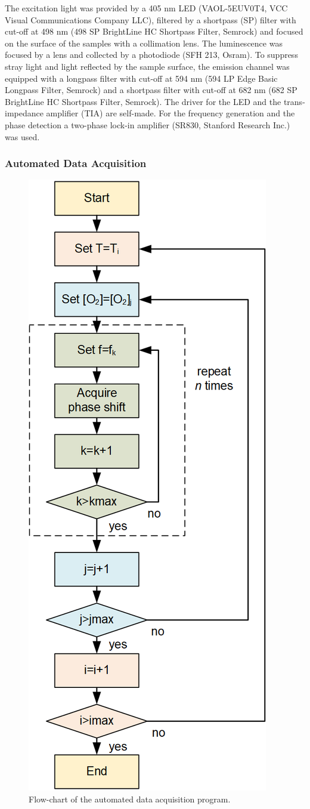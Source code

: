 \documentclass[sensors,article,submit,moreauthors,pdftex,10pt,a4paper]{Definitions/mdpi}
\begin{document}
The excitation light was provided by a 405 nm LED (VAOL-5EUV0T4, VCC Visual Communications Company LLC), filtered by a shortpass (SP) filter with cut-off at 498 nm (498 SP BrightLine HC Shortpass Filter, Semrock) and focused on the surface of the samples with a collimation lens. The luminescence was focused by a lens and collected by a photodiode (SFH 213, Osram).
To suppress stray light and light reflected by the sample surface, the emission channel was equipped with a longpass filter with cut-off at 594 nm (594 LP Edge Basic Longpass Filter, Semrock) and a shortpass filter with cut-off at 682 nm (682 SP BrightLine HC Shortpass Filter, Semrock). The driver for the LED and the trans-impedance amplifier (TIA) are self-made.
For the frequency generation and the phase detection a two-phase lock-in amplifier (SR830, Stanford Research Inc.) was used. 

\subsubsection{Automated Data Acquisition}
\label{Data}

\begin{figure}[b!]
\centering
\includegraphics[keepaspectratio, width=5.8 cm]{flow-chart.png}
\caption{Flow-chart of the automated data acquisition program.}
\label{fig:auto-data}
\end{figure}
\end{document}
